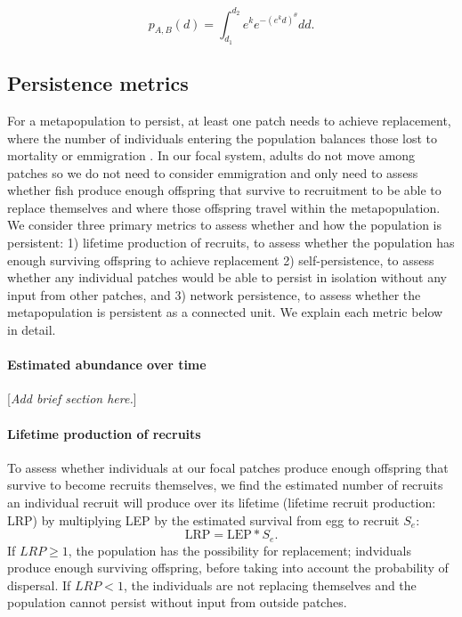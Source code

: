 \documentclass[12pt, oneside]{article}   	%
\begin{document}
\begin{equation} %
p_{A, B}(d) = \int_{d_1}^{d_2} e^k e^{-(e^k d)^\theta}  dd. \label{EQN_integratingDK}
\end{equation}

\subsection*{Persistence metrics}

For a metapopulation to persist, at least one patch needs to achieve replacement, where the number of individuals entering the population balances those lost to mortality or emmigration \citep{burgess2014beyond, hastings_persistence_2006}. In our focal system, adults do not move among patches so we do not need to consider emmigration and only need to assess whether fish produce enough offspring that survive to recruitment to be able to replace themselves and where those offspring travel within the metapopulation. We consider three primary metrics to assess whether and how the population is persistent: 1) lifetime production of recruits, to assess whether the population has enough surviving offspring to achieve replacement 2) self-persistence, to assess whether any individual patches would be able to persist in isolation without any input from other patches, and 3) network persistence, to assess whether the metapopulation is persistent as a connected unit. We explain each metric below in detail. %


\paragraph*{Estimated abundance over time}

[\textit{Add brief section here.}]

\paragraph*{Lifetime production of recruits}

To assess whether individuals at our focal patches produce enough offspring that survive to become recruits themselves, we find the estimated number of recruits an individual recruit will produce over its lifetime (lifetime recruit production: LRP) by multiplying LEP by the estimated survival from egg to recruit $S_e$:
\begin{equation}
\text{LRP} = \text{LEP} * S_e. \label{EQN_LRP}
\end{equation}
If $LRP \geq 1$, the population has the possibility for replacement; indviduals produce enough surviving offspring, before taking into account the probability of dispersal. If $LRP < 1$, the individuals are not replacing themselves and the population cannot persist without input from outside patches.
\end{document}
